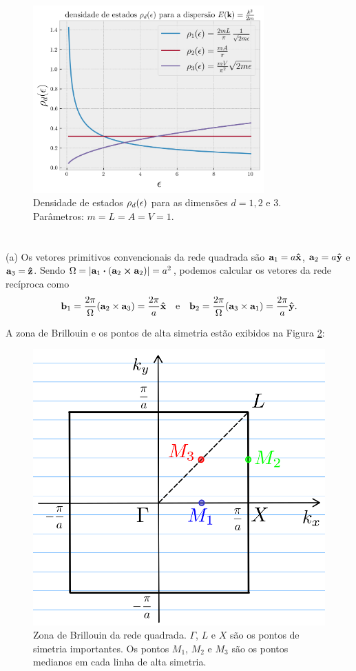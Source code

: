 \documentclass[a4paper,10pt]{article}
\begin{document}
\begin{enumerate}[(a)]
\begin{figure}[H]
\centering
\includegraphics[width=0.79\textwidth]{fig/dos-k2.png}
\caption{Densidade de estados $\rho_d(\epsilon)$ para as dimensões $d = 1, 2$ e $3$. Parâmetros: $m = L = A = V = 1$.}
\label{fig:dosk2}
\end{figure}

\end{enumerate}



\pagebreak

\section{}

(a) Os vetores primitivos convencionais da rede quadrada são $\vb{a}_1 = a \vu{x}$, $\vb{a}_2 = a \vu{y}$ e $\vb{a}_3 = \vu{z}$. Sendo $\Omega = \abs{\a_1 \vdot (\a_2 \cross \a_2)} = a^2$, podemos calcular os vetores da rede recíproca como
$$
\vb{b}_1 = \frac{2\pi}{\Omega} (\vb{a}_2 \times \vb{a}_3) = \frac{2\pi}{a} \vu{x} \quad \mathrm{e} \quad \vb{b}_2 = \frac{2\pi}{\Omega}(\vb{a}_3 \times \vb{a}_1) = \frac{2\pi}{a} \vu{y}.
$$

A zona de Brillouin e os pontos de alta simetria estão exibidos na Figura \ref{fig:square_lattice_bz}:
\begin{figure}[H]
\centering
\includegraphics[width=0.4\linewidth]{fig/square_lattice_bz.png}
\caption{Zona de Brillouin da rede quadrada. $\Gamma$, $L$ e $X$ são os pontos de simetria importantes. Os pontos $M_1$, $M_2$ e $M_3$ são os pontos medianos em cada linha de alta simetria.}
\label{fig:square_lattice_bz}
\end{figure}
\end{document}
